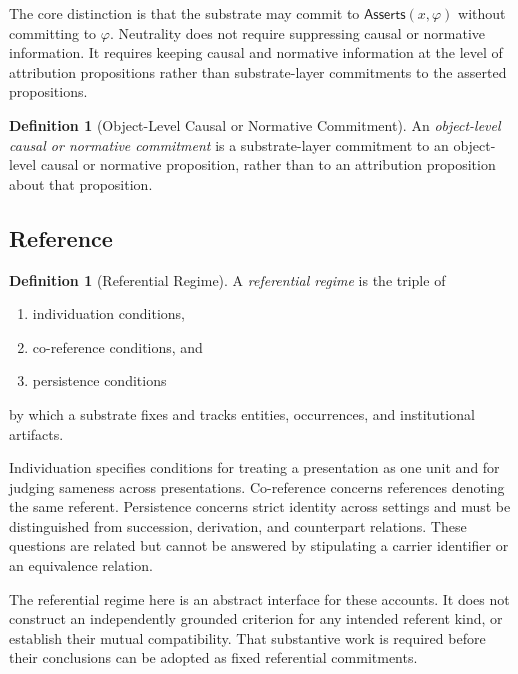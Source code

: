 \documentclass[11pt]{article}
\theoremstyle{plain}
\theoremstyle{definition}
\newtheorem{definition}[theorem]{Definition}
\theoremstyle{remark}
\newcommand{\Asserts}{\mathsf{Asserts}}
\begin{document}
The core distinction is that the substrate may commit to
$\Asserts(x,\varphi)$
without committing to $\varphi$.
Neutrality does not require suppressing causal or normative information.
It requires keeping causal and normative information at the level
of attribution propositions rather than substrate-layer commitments
to the asserted propositions.

\begin{definition}[Object-Level Causal or Normative Commitment]
  \label{se100.def.ObjectLevelCausalNormativeCommitment}
  An \emph{object-level causal or normative commitment} is a substrate-layer
  commitment to an object-level causal or normative proposition,
  rather than to an attribution proposition about that proposition.
\end{definition}


\subsection*{Reference}

\begin{definition}[Referential Regime]
  \label{se100.def.ReferentialRegime}
  A \emph{referential regime} is the triple of
  \begin{enumerate}
    \item individuation conditions,
    \item co-reference conditions, and
    \item persistence conditions
  \end{enumerate}
  by which a substrate fixes and tracks entities, occurrences, and institutional
  artifacts.
\end{definition}

Individuation specifies conditions for treating a presentation as one
unit and for judging sameness across presentations.
Co-reference concerns references denoting the same referent.
Persistence concerns strict identity across settings and must be
distinguished from succession, derivation, and counterpart relations.
These questions are related but cannot be answered by stipulating
a carrier identifier or an equivalence relation.

The referential regime here is an abstract interface for these accounts.
It does not construct an independently grounded criterion for any
intended referent kind, or establish their mutual compatibility.
That substantive work is required before their conclusions can be
adopted as fixed referential commitments.
\end{document}
